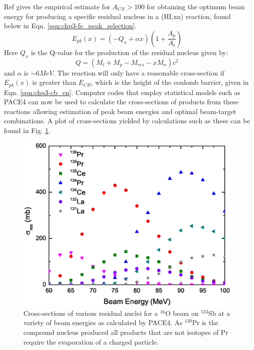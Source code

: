 Ref \cite{nucSpecAndReacPartC} gives the empirical estimate for $A_{CN}>100$ for obtaining the optimum beam energy for producing a specific residual nucleus in a (HI,xn) reaction, found below in Eqn. \ref{eqn:chp3-fe_peak_selection}.
\begin{equation}
\label{eqn:chp3-fe_peak_selection}
E_{pk}(x)=(-Q_{x} + \alpha{}x)(1+\frac{A_p}{A_t})
\end{equation}
Here $Q_x$ is the Q-value for the production of the residual nucleus given by:
\begin{equation}
\label{eqn:chp3-res_qvalue}
Q = (M_t+M_p-M_{res}-x M_n)c^2
\end{equation}
and $\alpha$ is $\sim6MeV$. The reaction will only have a reasonable cross-section if $E_{pk}(x)$ is greater than $E_{CB}$, which is the height of the coulomb barrier, given in Eqn. \ref{eqn:chp3-cb_en}. Computer codes that employ statistical models such as PACE4\cite{PACE4,PACE4_2} can now be used to calculate the cross-sections of products from these reactions allowing estimation of peak beam energies and optimal beam-target combinations. A plot of cross-sections yielded by calculations such as these can be found in Fig. \ref{fig:chp3-pace4-calc}.

\begin{figure}[h!]
	\centerline{\includegraphics[width=\textwidth]{./img/c3/135Pr_calc_plot.eps}}
	\caption{Cross-sections of various residual nuclei for a $^{16}$O beam on $^{123}$Sb at a variety of beam energies as calculated by PACE4. As $^{139}$Pr is the compound nucleus produced all products that are not isotopes of Pr require the evaporation of a charged particle.}
	\label{fig:chp3-pace4-calc}
\end{figure}

